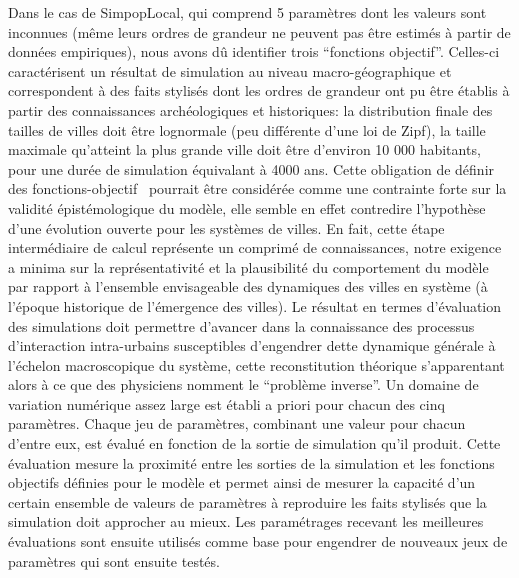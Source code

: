 \documentclass[10pt]{article}
\begin{document}
Dans le cas de SimpopLocal, qui comprend 5 paramètres dont les valeurs sont inconnues (même leurs ordres de grandeur ne peuvent pas être estimés à partir de données empiriques), nous avons dû identifier trois “fonctions objectif”. Celles-ci caractérisent un résultat de simulation au niveau macro-géographique et correspondent à des faits stylisés dont les ordres de grandeur ont pu être établis à partir des connaissances archéologiques et historiques: la distribution finale des tailles de villes doit être lognormale (peu différente d’une loi de Zipf), la taille maximale qu’atteint la plus grande ville doit être d’environ 10 000 habitants, pour une durée de simulation équivalant à 4000 ans.
Cette obligation de définir des fonctions-objectif  pourrait être considérée comme une contrainte forte sur la validité épistémologique du modèle, elle semble en effet contredire l’hypothèse d’une évolution ouverte pour les systèmes de villes. En fait, cette étape intermédiaire de calcul représente un comprimé de connaissances, notre exigence a minima sur la représentativité et la plausibilité du comportement du modèle par rapport à l’ensemble envisageable des dynamiques des villes en système (à l’époque historique de l’émergence des villes). Le résultat en termes d’évaluation des simulations doit permettre d’avancer dans la connaissance des processus d’interaction intra-urbains susceptibles d’engendrer dette dynamique générale à l’échelon macroscopique du système, cette reconstitution théorique s’apparentant alors à ce que des physiciens nomment le “problème inverse”.
Un domaine de variation numérique assez large est établi a priori pour chacun des cinq paramètres. Chaque jeu de paramètres, combinant une valeur pour chacun d’entre eux, est évalué en fonction de la sortie de simulation qu'il produit. Cette évaluation mesure la proximité entre les sorties de la simulation et les fonctions objectifs définies pour le modèle et permet ainsi de mesurer la capacité d’un certain ensemble de valeurs de paramètres à reproduire les faits stylisés que la simulation doit approcher au mieux. Les paramétrages recevant les meilleures évaluations sont ensuite utilisés comme base pour engendrer de nouveaux jeux de paramètres qui sont ensuite testés. 
\end{document}

